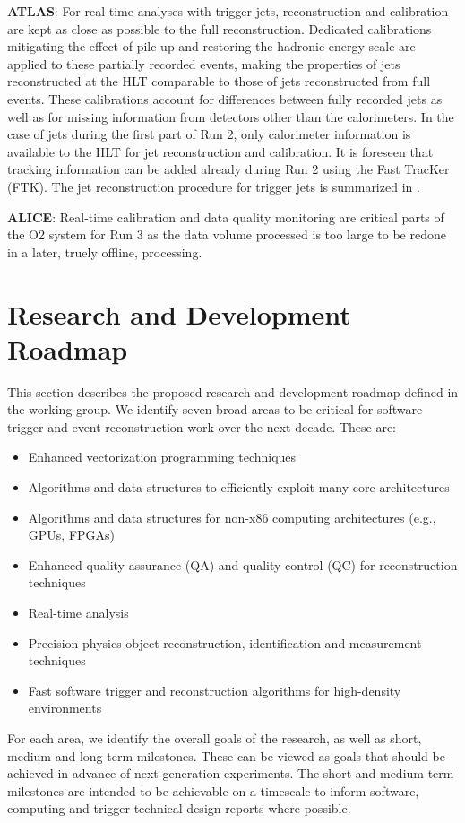 \vskip 0.5cm
\noindent
{\bf ATLAS}: For real-time analyses with trigger jets, reconstruction and calibration are  kept as close as possible to the full reconstruction. 
Dedicated calibrations mitigating the effect of pile-up and restoring the hadronic energy scale are applied to these partially recorded events, making the properties of jets reconstructed at 
the HLT comparable to those of jets reconstructed from full events. These calibrations account for differences between fully recorded jets as well as for missing information from detectors 
other than the calorimeters. In the case of jets during the first part of Run 2, only calorimeter information is available to the HLT for jet reconstruction and calibration. It is foreseen 
that tracking information can be added already during Run 2 using the Fast TracKer (FTK). The jet reconstruction procedure for trigger jets is summarized in \cite{Abreu2014}. 

\vskip 0.5cm
\noindent
{\bf ALICE}: Real-time calibration and data quality monitoring are critical parts of the O2 system for Run 3 as the data volume processed is too large to be redone in a later, truely offline, processing.

\section{Research and Development Roadmap}

This section describes the proposed research and development roadmap defined in the working group. We identify seven broad areas to be critical for software trigger and event reconstruction 
work over the next decade. These  are:
\begin{itemize}
\item Enhanced vectorization programming techniques
\item Algorithms and data structures to efficiently exploit many-core architectures
\item Algorithms and data structures for non-x86 computing architectures (e.g., GPUs, FPGAs)
\item Enhanced quality assurance (QA) and quality control (QC) for reconstruction techniques
\item Real-time analysis
\item Precision physics-object reconstruction, identification and measurement techniques
\item Fast software trigger and reconstruction algorithms for high-density environments
\end{itemize}
For each area, we identify the overall goals of the research, as well as short, medium and long term milestones. These can be viewed as goals that should be achieved in advance of next-generation 
experiments. The short and medium term milestones are intended to be achievable on a timescale to inform software, computing and trigger technical design reports where possible.


